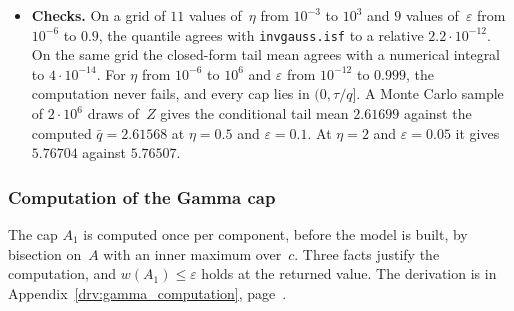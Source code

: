 \documentclass[11pt,a4paper]{article}
\theoremstyle{plain}
\theoremstyle{definition}
\theoremstyle{remark}
\begin{document}
\begin{itemize}
\begin{center}
\begin{tabular}{@{}lcc@{}}
    \bottomrule
    \end{tabular}
    \end{center}
  \item \textbf{Checks.} On a grid of $11$ values of~$\eta$ from $10^{-3}$ to $10^{3}$ and $9$ values of~$\varepsilon$ from $10^{-6}$ to $0.9$, the quantile agrees with \texttt{invgauss.isf} to a relative $2.2 \cdot 10^{-12}$.
    On the same grid the closed-form tail mean agrees with a numerical integral to $4 \cdot 10^{-14}$.
    For $\eta$ from $10^{-6}$ to $10^{6}$ and $\varepsilon$ from $10^{-12}$ to $0.999$, the computation never fails, and every cap lies in $(0, \tau/q]$.
    A Monte Carlo sample of $2 \cdot 10^{6}$ draws of~$Z$ gives the conditional tail mean $2.61699$ against the computed $\bar q = 2.61568$ at $\eta = 0.5$ and $\varepsilon = 0.1$.
    At $\eta = 2$ and $\varepsilon = 0.05$ it gives $5.76704$ against $5.76507$.
\end{itemize}

\subsubsection{Computation of the Gamma cap}
The cap $A_1$ is computed once per component, before the model is built, by bisection on~$A$ with an inner maximum over~$c$.
Three facts justify the computation, and $w(A_1) \le \varepsilon$ holds at the returned value.
The derivation is in Appendix~\ref{drv:gamma_computation}, page~\pageref{drv:gamma_computation}.
\end{document}
